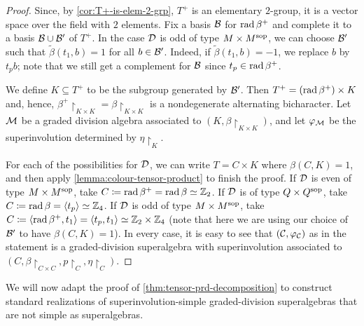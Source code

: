 \begin{proof}
    Since, by \cref{cor:T+-is-elem-2-grp}, $T^+$ is an elementary $2$-group, it is a vector space over the field with $2$ elements. 
    Fix a basis $\mathcal B$ for $\operatorname{rad} \beta^+$ and complete it to a basis  $\mathcal B \cup \mathcal B'$ of $T^+$. 
    In the case $\mathcal{D}$ is odd of type $M\times M^{\mathrm{sop}}$, we can choose $\mathcal B'$ such that $\tilde\beta(t_1, b) = 1$ for all $b\in \mathcal B'$. 
    Indeed, if $\tilde\beta(t_1, b) = -1$, we replace $b$ by $t_p b$; note that we still get a complement for $\mathcal B$ since $t_p \in \operatorname{rad} \beta^+$. 
    
    We define $K \subseteq T^+$ to be the subgroup generated by $\mathcal B'$. 
    Then $T^+ = (\operatorname{rad} \beta^+) \times K$ and, hence, $\beta^+\restriction_{K\times K} = \beta\restriction_{K\times K}$ is a nondegenerate alternating bicharacter. 
    Let $\mathcal M$ be a graded division algebra associated to $(K, \beta\restriction_{K\times K})$, and let $\varphi_{\mathcal M}$ be the superinvolution determined by $\eta\restriction_{K}$. 
    
    For each of the possibilities for $\mathcal{D}$, we can write $T = C \times K$ where $\beta(C, K) = 1$, and then apply \cref{lemma:colour-tensor-product} to finish the proof. 
    If $\mathcal{D}$ is even of type $M\times M^{\mathrm{sop}}$, take $C \coloneqq \operatorname{rad} \beta^+ = \operatorname{rad} \beta \simeq \mathbb{Z}_2$. 
    If $\mathcal{D}$ is of type $Q\times Q^{\mathrm{sop}}$, take $C \coloneqq \operatorname{rad} \beta = \langle t_p \rangle \simeq \mathbb{Z}_4$. 
    If $\mathcal{D}$ is odd of type $M\times M^{\mathrm{sop}}$, take $C \coloneqq \langle \operatorname{rad} \beta^+, t_1 \rangle = \langle t_p, t_1 \rangle \simeq \mathbb{Z}_2 \times \mathbb{Z}_4$ (note that here we are using our choice of $\mathcal B'$ to have $\beta(C, K) = 1$). 
    In every case, it is easy to see that $(\mathcal C, \varphi_{\mathcal C})$ as in the statement is a graded-division superalgebra with superinvolution associated to $(C, \beta\restriction_{C \times C}, p\restriction_{C}, \eta\restriction_{C})$. 
\end{proof}

We will now adapt the proof of \cref{thm:tensor-prd-decomposition} to construct standard realizations of superinvolution-simple graded-division superalgebras that are not simple as superalgebras. 

